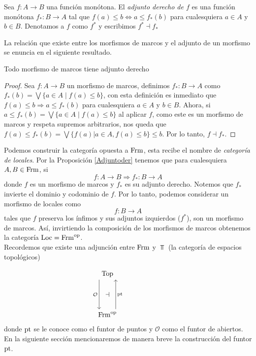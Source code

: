 \begin{dfn}\label{adjder}
Sea $f:A\to B$ una función monótona. El \emph{adjunto derecho de $f$} es una función monótona $f_*:B\to A$ tal que $f(a)\leq b\Leftrightarrow a\leq f_*(b)$ para cualesquiera $a\in A$ y $b\in B$. Denotamos a $f$ como $f^*$ y escribimos \emph{$f^*\dashv f_*$}
\end{dfn}

La relación que existe entre los morfismos de marcos y el adjunto de un morfismo se enuncia en el siguiente resultado.

\begin{prop}\label{Adjuntoder}
Todo morfismo de marcos tiene adjunto derecho
\end{prop}

\begin{proof}
Sea $f\colon A\rightarrow B$ un morfismo de marcos, definimos $f_{*}\colon B\to A$ como $f_{*}(b)=\bigvee\{a\in A\mid f(a)\leq b\}$, con esta definición es inmediato que $f(a)\leq b\Rightarrow a\leq f_{*}(b)$ para cualesquiera $a\in A$ y $b\in B$. Ahora, si $a\leq f_{*}(b)=\bigvee \{a\in A\mid f(a)\leq b\}$ al aplicar $f$, como este es un morfismo de marcos y respeta supremos arbitrarios, nos queda que $f(a)\leq f_{*}(b)=\bigvee \{f(a)|a\in A, f(a)\leq b\}\leq b$. Por lo tanto, $f\dashv f_{*}$.
\end{proof}

Podemos construir la categoría opuesta a $\mathrm{Frm}$, esta recibe el nombre de \emph{categoría de locales}. Por la Proposición \ref{Adjuntoder} tenemos que para cualesquiera $A, B\in \mathrm{Frm}$, si
\[
f\colon A\rightarrow B \Longrightarrow f_*\colon B\rightarrow A
\]
donde $f$ es un morfismo de marcos y $f_*$ es su adjunto derecho. Notemos que $f_*$ invierte el dominio y codominio de $f$. Por lo tanto, podemos considerar un morfismo de locales como 
\[
f\colon B\rightarrow A 
\]
tales que $f$ preserva los ínfimos y sus adjuntos izquierdos ($f^*$), son un morfismo de marcos. Así, invirtiendo la composición de los morfismos de marcos obtenemos la categoría $\mathrm{Loc}=\mathrm{Frm}^{\mathrm{op}}$.\\

Recordemos que existe una adjunción entre $\mathrm{Frm}$ y $\Top$ (la categoría de espacios topológicos)

\[\begin{tikzcd}
	{\Top} \\
	{} & {} & {} \\
	{\Frm^{\op}}
	\arrow["{\pt}"{name=0, swap}, from=3-1, to=1-1, shift right=5]
	\arrow["{\mathcal{O}}"{name=1, swap}, from=1-1, to=3-1, shift right=5]
	\arrow["\dashv"{rotate=0}, from=1, to=0, phantom]
\end{tikzcd}\]
donde $\mathrm{pt}$ se le conoce como el funtor de puntos y $\mathcal{O}$ como el funtor de abiertos. En la siguiente sección mencionaremos de manera breve la construcción del funtor $\mathrm{pt}$.\\

